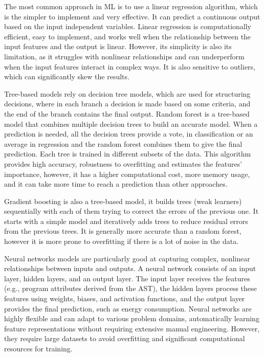 \documentclass[sigplan]{acmart}
\begin{document}
The most common approach in ML is to use a linear regression algorithm, which is the simpler to implement and very effective. It can predict a continuous output based on the input independent variables. Linear regression is computationally efficient, easy to implement, and works well when the relationship between the input features and the output is linear. However, its simplicity is also its limitation, as it struggles with nonlinear relationships and can underperform when the input features interact in complex ways. It is also sensitive to outliers, which can significantly skew the results.

Tree-based models rely on decision tree models, which are used for structuring decisions, where in each branch a decision is made based on some criteria, and the end of the branch contains the final output. Random forest is a tree-based model that combines multiple decision trees to build an accurate model. When a prediction is needed, all the decision trees provide a vote, in classification or an average in regression and the random forest combines them to give the final prediction. Each tree is trained in different subsets of the data. This algorithm provides high accuracy, robustness to overfitting and estimates the features' importance, however, it has a higher computational cost, more memory usage, and it can take more time to reach a prediction than other approaches.

Gradient boosting is also a tree-based model, it builds trees (weak learners) sequentially with each of them trying to correct the errors of the previous one. It starts with a simple model and iteratively adds trees to reduce residual errors from the previous trees. It is generally more accurate than a random forest, however it is more prone to overfitting if there is a lot of noise in the data.

Neural networks models are particularly good at capturing complex, nonlinear relationships between inputs and outputs. A neural network consists of an input layer, hidden layers, and an output layer. The input layer receives the features (e.g., program attributes derived from the AST), the hidden layers process these features using weights, biases, and activation functions, and the output layer provides the final prediction, such as energy consumption. Neural networks are highly flexible and can adapt to various problem domains, automatically learning feature representations without requiring extensive manual engineering. However, they require large datasets to avoid overfitting and significant computational resources for training.
\end{document}
